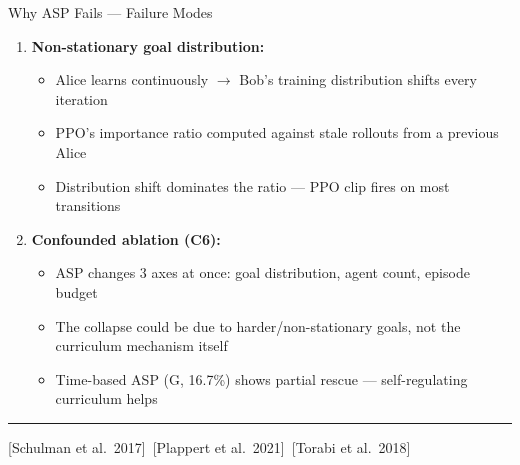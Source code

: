 \documentclass[aspectratio=169,xcolor=dvipsnames,t]{beamer}
\newcommand{\litfooter}[1]{%
  \vspace{2pt}%
  \hrule%
  \vspace{2pt}%
  {\tiny\color{LightDarkGrey} #1}%
}
\begin{document}

\begin{frame}[t]{Why ASP Fails — Failure Modes}
  \begin{enumerate}
    \item \textbf{Non-stationary goal distribution:}
    \begin{itemize}
      \item Alice learns continuously $\rightarrow$ Bob's training distribution shifts every iteration
      \item PPO's importance ratio computed against stale rollouts from a previous Alice
      \item Distribution shift dominates the ratio — PPO clip fires on most transitions
    \end{itemize}

    \item \textbf{Confounded ablation (C6):}
    \begin{itemize}
      \item ASP changes 3 axes at once: goal distribution, agent count, episode budget
      \item The collapse could be due to harder/non-stationary goals, not the curriculum mechanism itself
      \item Time-based ASP (G, 16.7\%) shows partial rescue — self-regulating curriculum helps
    \end{itemize}
  \end{enumerate}

  \vfill\litfooter{[Schulman et al.\ 2017]~[Plappert et al.\ 2021]~[Torabi et al.\ 2018]}
\end{frame}
\end{document}
